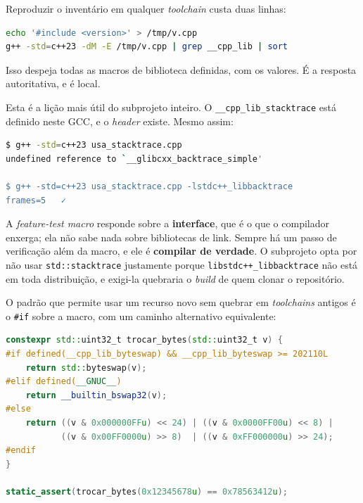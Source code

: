 \begin{regra}
Reproduzir o inventário em qualquer \emph{toolchain} custa duas linhas:
\begin{lstlisting}[style=bt, language=bash, frame=none,
                   xleftmargin=0pt, xrightmargin=0pt]
echo '#include <version>' > /tmp/v.cpp
g++ -std=c++23 -dM -E /tmp/v.cpp | grep __cpp_lib | sort
\end{lstlisting}
Isso despeja todas as macros de biblioteca definidas, com os valores. É a
resposta autoritativa, e é local.
\end{regra}

\begin{armadilha}
Esta é a lição mais útil do subprojeto inteiro. O
\texttt{\_\_cpp\_lib\_stacktrace} está definido neste GCC, e o \emph{header}
existe. Mesmo assim:
\begin{lstlisting}[style=bt, language=bash, frame=none,
                   xleftmargin=0pt, xrightmargin=0pt]
$ g++ -std=c++23 usa_stacktrace.cpp
undefined reference to `__glibcxx_backtrace_simple'

$ g++ -std=c++23 usa_stacktrace.cpp -lstdc++_libbacktrace
frames=5   ✓
\end{lstlisting}
A \emph{feature-test macro} responde sobre a \textbf{interface}, que é o que o
compilador enxerga; ela não sabe nada sobre bibliotecas de link. Sempre há um
passo de verificação além da macro, e ele é \textbf{compilar de verdade}. O
subprojeto opta por não usar \texttt{std::stacktrace} justamente porque
\texttt{libstdc++\_libbacktrace} não está em toda distribuição, e exigi-la
quebraria o \emph{build} de quem clonar o repositório.
\end{armadilha}

O padrão que permite usar um recurso novo sem quebrar em \emph{toolchains}
antigos é o \texttt{\#if} sobre a macro, com um caminho alternativo equivalente:

\begin{lstlisting}[style=bt, language=C++,
    caption={Três implementações escolhidas em compilação, em
             \texttt{src/cpp23/demo\_inventario.hpp}.}]
constexpr std::uint32_t trocar_bytes(std::uint32_t v) {
#if defined(__cpp_lib_byteswap) && __cpp_lib_byteswap >= 202110L
    return std::byteswap(v);
#elif defined(__GNUC__)
    return __builtin_bswap32(v);
#else
    return ((v & 0x000000FFu) << 24) | ((v & 0x0000FF00u) << 8) |
           ((v & 0x00FF0000u) >> 8)  | ((v & 0xFF000000u) >> 24);
#endif
}

static_assert(trocar_bytes(0x12345678u) == 0x78563412u);
\end{lstlisting}

